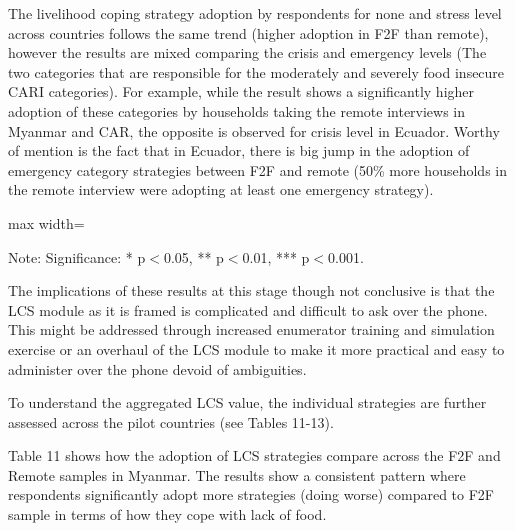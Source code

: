 \documentclass[11pt,harvard]{article}
\begin{document}
The livelihood coping strategy adoption by respondents for none and stress level across countries follows the same trend (higher adoption in F2F than remote), however the results are mixed comparing the crisis and emergency levels (The two categories that are responsible for the moderately and severely food insecure CARI categories). For example, while the result shows a significantly higher adoption of these categories by households taking the remote interviews in Myanmar and CAR, the opposite is observed for crisis level in Ecuador. Worthy of mention is the fact that in Ecuador, there is big jump in the adoption of emergency category strategies between F2F and remote (50\% more households in the remote interview were adopting at least one emergency strategy). 

\begin{table}[htbp]
	\centering
	\begin{adjustbox}{max width=\textwidth}
		\begin{threeparttable}
			\caption{Impact of Survey Modality on Livelihood Coping Strategy Index}
			\scriptsize
			 
			\label{tab:LCS_Modality_All_Country}
			\begin{tablenotes}
				\item Note: Significance: * p$<$0.05, ** p$<$0.01, *** p$<$0.001. 
			\end{tablenotes}
		\end{threeparttable}
	\end{adjustbox}
\end{table}

The implications of these results at this stage though not conclusive is that the LCS module as it is framed is complicated and difficult to ask over the phone. This might be addressed through increased enumerator training and simulation exercise or an overhaul of the LCS module to make it more practical and easy to administer over the phone devoid of ambiguities.  

To understand the aggregated LCS value, the individual strategies are further assessed across the pilot countries (see Tables 11-13).

Table 11 shows how the adoption of LCS strategies compare across the F2F and Remote samples in Myanmar. The results show a consistent pattern where respondents significantly adopt more strategies (doing worse) compared to F2F sample in terms of how they cope with lack of food. 
\end{document}

